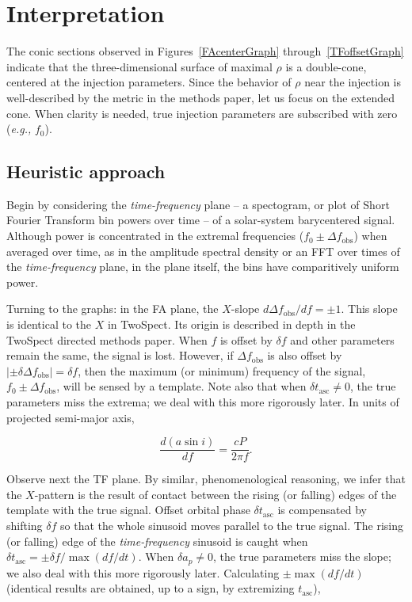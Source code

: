 \documentclass{article}
\begin{document}
\section{Interpretation}

The conic sections observed in Figures~\ref{FAcenterGraph} through~\ref{TFoffsetGraph} indicate that the three-dimensional surface of maximal $\rho$ is a double-cone, centered at the injection parameters.
Since the behavior of $\rho$ near the injection is well-described by the metric in the methods paper, let us focus on the extended cone.
When clarity is needed, true injection parameters are subscribed with zero (\textit{e.g.,} $f_0$).

\subsection{Heuristic approach}

Begin by considering the \textit{time-frequency} plane -- a spectogram, or plot of Short Fourier Transform bin powers over time -- of a solar-system barycentered signal.
Although power is concentrated in the extremal frequencies ($f_0 \pm \Delta f_\mathrm{obs}$) when averaged over time, as in the amplitude spectral density or an FFT over times of the \textit{time-frequency} plane, in the plane itself, the bins have comparitively uniform power.

Turning to the graphs: in the FA plane, the $X$-slope $d \Delta f_\mathrm{obs} / df = \pm1$.
This slope is identical to the $X$ in TwoSpect.
Its origin is described in depth in the TwoSpect directed methods paper.
When $f$ is offset by $\delta f$ and other parameters remain the same, the signal is lost.
However, if $\Delta f_\mathrm{obs}$ is also offset by $|\pm \delta \Delta f_\mathrm{obs}| = \delta f$, then the maximum (or minimum) frequency of the signal, $f_0 \pm \Delta f_\mathrm{obs}$, will be sensed by a template. 
Note also that when $\delta t_\mathrm{asc} \neq 0$, the true parameters miss the extrema; we deal with this more rigorously later.
In units of projected semi-major axis,

\begin{equation}
\frac{d (a \sin i)}{d f} = \frac{c P}{2 \pi f}.
\end{equation}

Observe next the TF plane.
By similar, phenomenological reasoning, we infer that the $X$-pattern is the result of contact between the rising (or falling) edges of the template with the true signal. 
Offset orbital phase $\delta t_\mathrm{asc}$ is compensated by shifting $\delta f$ so that the whole sinusoid moves parallel to the true signal.
The rising (or falling) edge of the \textit{time-frequency} sinusoid is caught when $\delta t_\mathrm{asc} = \pm \delta f / \max(df /dt)$.
When $\delta a_p \neq 0$, the true parameters miss the slope; we also deal with this more rigorously later.
Calculating $\pm \max \left(d f / d t\right)$ (identical results are obtained, up to a sign, by extremizing $t_\mathrm{asc}$),
\end{document}
